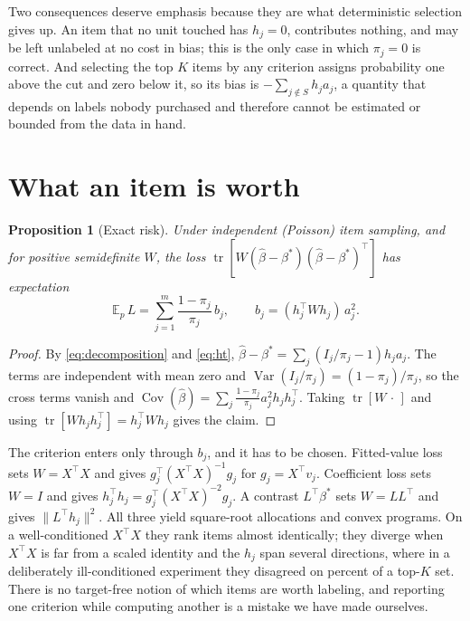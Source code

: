 \documentclass[11pt]{article}
\newcommand{\E}{\mathbb{E}}
\newcommand{\Var}{\operatorname{Var}}
\newcommand{\Cov}{\operatorname{Cov}}
\newcommand{\tr}{\operatorname{tr}}
\theoremstyle{plain}
\newtheorem{proposition}{Proposition}
\theoremstyle{remark}
\begin{document}
Two consequences deserve emphasis because they are what deterministic selection gives up. An item that no unit touched has $h_j=0$, contributes nothing, and may be left unlabeled at no cost in bias; this is the only case in which $\pi_j=0$ is correct. And selecting the top $K$ items by any criterion assigns probability one above the cut and zero below it, so its bias is $-\sum_{j\notin S}h_ja_j$, a quantity that depends on labels nobody purchased and therefore cannot be estimated or bounded from the data in hand.

\section{What an item is worth}

\begin{proposition}[Exact risk]
\label{prop:risk}
Under independent (Poisson) item sampling, and for positive semidefinite $W$, the loss $\tr[W(\widehat\beta-\beta^*)(\widehat\beta-\beta^*)^\top]$ has expectation
\begin{equation}
\label{eq:risk}
\E_p\,L=\sum_{j=1}^m \frac{1-\pi_j}{\pi_j}\,b_j,\qquad b_j=(h_j^\top W h_j)\,a_j^2 .
\end{equation}
\end{proposition}

\begin{proof}
By \eqref{eq:decomposition} and \eqref{eq:ht}, $\widehat\beta-\beta^*=\sum_j(I_j/\pi_j-1)h_ja_j$. The terms are independent with mean zero and $\Var(I_j/\pi_j)=(1-\pi_j)/\pi_j$, so the cross terms vanish and $\Cov(\widehat\beta)=\sum_j\frac{1-\pi_j}{\pi_j}a_j^2h_jh_j^\top$. Taking $\tr[W\,\cdot\,]$ and using $\tr[Wh_jh_j^\top]=h_j^\top Wh_j$ gives the claim.
\end{proof}

The criterion enters only through $b_j$, and it has to be chosen. Fitted-value loss sets $W=X^\top X$ and gives $g_j^\top(X^\top X)^{-1}g_j$ for $g_j=X^\top v_j$. Coefficient loss sets $W=I$ and gives $h_j^\top h_j=g_j^\top(X^\top X)^{-2}g_j$. A contrast $L^\top\beta^*$ sets $W=LL^\top$ and gives $\|L^\top h_j\|^2$. All three yield square-root allocations and convex programs. On a well-conditioned $X^\top X$ they rank items almost identically; they diverge when $X^\top X$ is far from a scaled identity and the $h_j$ span several directions, where in a deliberately ill-conditioned experiment they disagreed on \LossDisagreementPct{} percent of a top-$K$ set. There is no target-free notion of which items are worth labeling, and reporting one criterion while computing another is a mistake we have made ourselves.
\end{document}
